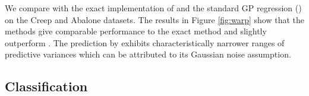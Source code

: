 We compare with the exact implementation of \cite{snelson2003warped} %
and the standard GP regression (\gpr) on the Creep \cite{cole2000modelling} and Abalone \cite{uci2013} datasets.
The results in Figure \ref{fig:warp} show that the \agp \space methods give comparable performance to the exact  method \wgp \space and slightly outperform \gpr.  
The prediction by \gpr \space exhibits characteristically narrower ranges of predictive variances which can be attributed to its Gaussian noise assumption.

\subsection{Classification}
